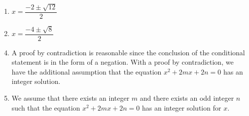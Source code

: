 \documentclass[11pt]{article}
\begin{document}
\begin{multicols}{2}
\begin{enumerate}
\item $x = \dfrac{{ - 2 \pm \sqrt {12} }}{2}$

\item $x = \dfrac{{ - 4 \pm \sqrt 8 }}{2}$

\end{enumerate}
\end{multicols}

\begin{enumerate} \setcounter{enumi}{3}
\item A proof by contradiction is reasonable since the conclusion of the conditional statement is in the form of a negation.  With a proof by contradiction, we have the additional assumption that the equation $x^2  + 2mx + 2n = 0$ has an integer solution.

\item We assume that there exists an integer  $m$  and there exists an odd integer $n$  such that the equation $x^2  + 2mx + 2n = 0$ has an integer solution for  $x$.


\end{enumerate}
\end{document}

